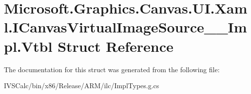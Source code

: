 \hypertarget{struct_microsoft_1_1_graphics_1_1_canvas_1_1_u_i_1_1_xaml_1_1_i_canvas_virtual_image_source_____impl_1_1_vtbl}{}\section{Microsoft.\+Graphics.\+Canvas.\+U\+I.\+Xaml.\+I\+Canvas\+Virtual\+Image\+Source\+\_\+\+\_\+\+Impl.\+Vtbl Struct Reference}
\label{struct_microsoft_1_1_graphics_1_1_canvas_1_1_u_i_1_1_xaml_1_1_i_canvas_virtual_image_source_____impl_1_1_vtbl}


The documentation for this struct was generated from the following file\+:\begin{DoxyCompactItemize}
\item 
I\+V\+S\+Calc/bin/x86/\+Release/\+A\+R\+M/ilc/Impl\+Types.\+g.\+cs\end{DoxyCompactItemize}
